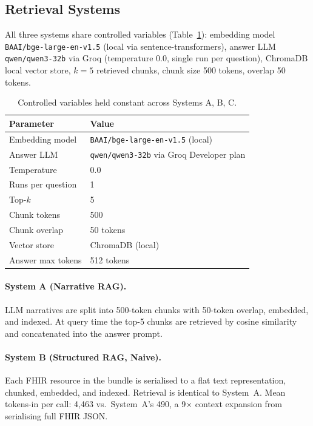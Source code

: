 \subsection{Retrieval Systems}
\label{sec:methods:systems}

All three systems share controlled variables (Table~\ref{tab:controlled}):
embedding model \texttt{BAAI/bge-large-en-v1.5} (local via sentence-transformers),
answer LLM \texttt{qwen/qwen3-32b} via Groq (temperature 0.0, single run per question),
ChromaDB local vector store, $k=5$ retrieved chunks, chunk size 500 tokens, overlap 50 tokens.

\begin{table}[!htbp]
\centering
\caption{Controlled variables held constant across Systems A, B, C.}
\label{tab:controlled}
\begin{tabular}{ll}
\toprule
Parameter & Value \\
\midrule
Embedding model & \texttt{BAAI/bge-large-en-v1.5} (local) \\
Answer LLM & \texttt{qwen/qwen3-32b} via Groq Developer plan \\
Temperature & 0.0 \\
Runs per question & 1 \\
Top-$k$ & 5 \\
Chunk tokens & 500 \\
Chunk overlap & 50 tokens \\
Vector store & ChromaDB (local) \\
Answer max tokens & 512 tokens \\
\bottomrule
\end{tabular}
\end{table}

\paragraph{System A (Narrative RAG).}
LLM narratives are split into 500-token chunks with 50-token overlap, embedded, and indexed.
At query time the top-5 chunks are retrieved by cosine similarity and concatenated into the
answer prompt.

\paragraph{System B (Structured RAG, Naive).}
Each FHIR resource in the bundle is serialised to a flat text representation, chunked,
embedded, and indexed.  Retrieval is identical to System~A.  Mean tokens-in per call: 4,463
vs.\ System~A's 490, a 9$\times$ context expansion from serialising full FHIR JSON.

